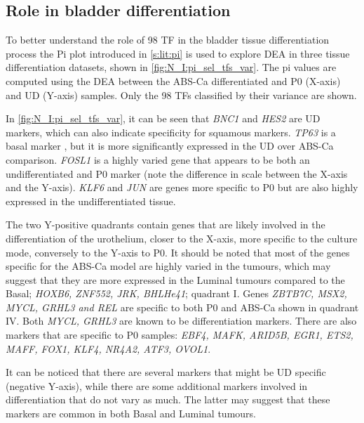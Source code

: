 \subsection{Role in bladder differentiation} \label{s:N:sel_tf_diff_status}


To better understand the role of 98 TF in the bladder tissue differentiation process the Pi plot introduced in \cref{s:lit:pi} is used to explore \gls{DEA} in three tissue differentiation datasets, shown in \cref{fig:N_I:pi_sel_tfs_var}. The pi values are computed using the DEA between the ABS-Ca differentiated and P0 (X-axis) and UD (Y-axis) samples. Only the 98 TFs classified by their variance are shown.

In \cref{fig:N_I:pi_sel_tfs_var}, it can be seen that \textit{BNC1} and \textit{HES2} are UD markers, which can also indicate specificity for squamous markers. \textit{TP63} is a basal marker \citep{Choi2012-kk,Karni-Schmidt2011-ps, Choi2014-ed}, but it is more significantly expressed in the UD over ABS-Ca comparison. \textit{FOSL1} is a highly varied gene that appears to be both an undifferentiated and P0 marker (note the difference in scale between the X-axis and the Y-axis). \textit{KLF6} and \textit{JUN} are genes more specific to P0 but are also highly expressed in the undifferentiated tissue.

The two Y-positive quadrants contain genes that are likely involved in the differentiation of the urothelium, closer to the X-axis, more specific to the culture mode, conversely to the Y-axis to P0. It should be noted that most of the genes specific for the ABS-Ca model are highly varied in the tumours, which may suggest that they are more expressed in the Luminal tumours compared to the Basal; \textit{HOXB6, ZNF552, JRK, BHLHe41}; quadrant I. Genes \textit{ZBTB7C, MSX2, MYCL, GRHL3 and REL} are specific to both P0 and ABS-Ca shown in quadrant IV. Both \textit{MYCL, GRHL3} are known to be differentiation markers. There are also markers that are specific to P0 samples: \textit{EBF4, MAFK, ARID5B, EGR1, ETS2, MAFF, FOX1, KLF4, NR4A2, ATF3, OVOL1}. 

It can be noticed that there are several markers that might be UD specific (negative Y-axis), while there are some additional markers involved in differentiation that do not vary as much. The latter may suggest that these markers are common in both Basal and Luminal tumours. 

